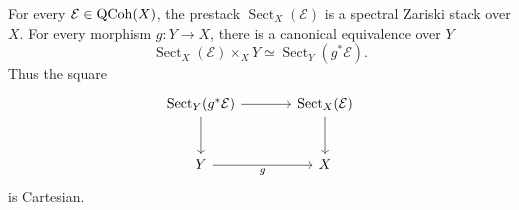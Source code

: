 \begin{proposition}
\label{prop:section-stack-descent-base-change}
For every \(\mathcal E\in\operatorname{QCoh}(X)\), the prestack
\(\operatorname{Sect}_X(\mathcal E)\) is a spectral Zariski stack over
\(X\). For every morphism \(g:Y\to X\), there is a canonical equivalence
over \(Y\)
\[
    \operatorname{Sect}_X(\mathcal E)\times_XY
    \simeq
    \operatorname{Sect}_Y(g^*\mathcal E).
\]
Thus the square
\[
\begin{tikzcd}[column sep=large, row sep=large]
    \operatorname{Sect}_Y(g^*\mathcal E)
        \arrow[r]
        \arrow[d]
    &
    \operatorname{Sect}_X(\mathcal E)
        \arrow[d]
    \\
    Y
        \arrow[r, "g"']
    &
    X
\end{tikzcd}
\]
is Cartesian.
\end{proposition}

